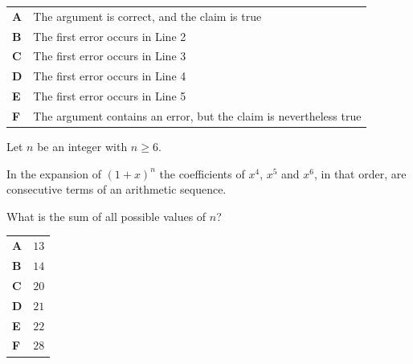 \documentclass[11pt,a4paper]{article}
\begin{document}
\begin{enumerate}[label=\textbf{\arabic*.},leftmargin=*,itemsep=0pt,start=15]
\par\vspace*{12pt}
\begin{tabularx}{\linewidth}{@{}>{\bfseries}l Y@{}}
A &
The argument is correct, and the claim is true
\\[0.8em]
B &
The first error occurs in Line 2
\\[0.8em]
C &
The first error occurs in Line 3
\\[0.8em]
D &
The first error occurs in Line 4
\\[0.8em]
E &
The first error occurs in Line 5
\\[0.8em]
F &
The argument contains an error, but the claim is nevertheless true
\\
\end{tabularx}
\end{enumerate}
\clearpage
\thispagestyle{djspaper}
\vspace*{8pt}
\begin{enumerate}[label=\textbf{\arabic*.},leftmargin=*,itemsep=0pt,start=16]
Let $n$ be an integer with $n \ge 6$. 

In the expansion of $(1+x)^n$ the coefficients of $x^4$, $x^5$ and $x^6$, in that order, are consecutive terms of an arithmetic sequence.

What is the sum of all possible values of $n$?

\par\vspace*{12pt}
\begin{tabularx}{\linewidth}{@{}>{\bfseries}l Y@{}}
A &
$13$
\\[0.8em]
B &
$14$
\\[0.8em]
C &
$20$
\\[0.8em]
D &
$21$
\\[0.8em]
E &
$22$
\\[0.8em]
F &
$28$
\\
\end{tabularx}
\end{enumerate}
\end{document}
